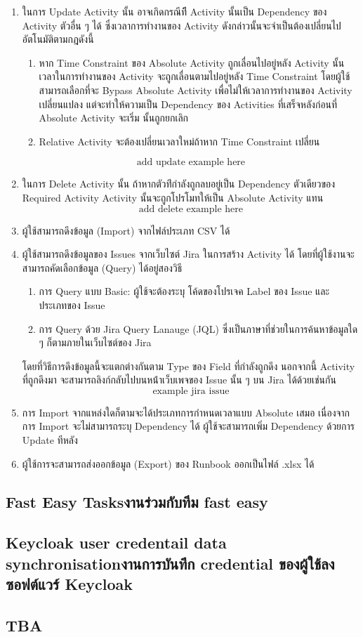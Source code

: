 \begin{enumerate}
\begin{enumerate}
    \end{enumerate}
    \item ในการ Update Activity นั้น อาจเกิดกรณีทีี Activity นั้นเป็น Dependency ของ Activity ตัวอื่น ๆ ได้ ซึ่งเวลาการทำงานของ Activity ดังกล่าวนั้นจะจำเป็นต้องเปลี่ยนไปอัตโนมัติตามกฎดังนี้
    \begin{enumerate}
        \item หาก Time Constraint ของ Absolute Activity ถูกเลื่อนไปอยู่หลัง Activity นั้น เวลาในการทำงานของ Activity จะถูกเลื่อนตามไปอยู่หลัง Time Constraint โดยผู้ใช้สามารถเลือกที่จะ Bypass Absolute Activity เพื่อไม่ให้เวลาการทำงานของ Activity เปลี่ยนแปลง แต่จะทำให้ความเป็น Dependency ของ Activities ที่เสร็จหลังก่อนที่ Absolute Activity จะเริ่ม นั้นถูกยกเลิก 
        \item Relative Activity จะต้องเปลี่ยนเวลาใหม่ถ้าหาก Time Constraint เปลี่ยน
    \end{enumerate}
    \[\text{add update example here}\]
    \item ในการ Delete Activity นั้น ถ้าหากตัวท่ีกำลังถูกลบอยู่เป็น Dependency ตัวเดียวของ Required Activity  Activity นั้นจะถูกโปรโมทให้เป็น Absolute Activity แทน
    \[\text{add delete example here}\]
    \item ผู้ใช้สามารถดึงข้อมูล (Import) จากไฟล์ประเภท CSV ได้ %
    \item ผู้ใช้สามารถดึงข้อมูลของ Issues จากเว็บไซต์ Jira ในการสร้าง​ Activity ได้ โดยที่ผู้ใช้งานจะสามารถคัดเลือกข้อมูล (Query) ได้อยู่สองวิธี
    \begin{enumerate}
        \item การ Query แบบ Basic: ผู้ใช้จะต้องระบุ โค้ดของโปรเจค Label ของ Issue และ ประเภทของ Issue
        \item การ Query ด้วย Jira Query Lanauge (JQL) ซึ่งเป็นภาษาที่ช่วยในการค้นหาข้อมูลใด ๆ ก็ตามภายในเว็บไซต์ของ Jira
    \end{enumerate}
    โดยที่วิธีการดึงข้อมูลนี้จะแตกต่างกันตาม Type ของ Field ที่กำลังถูกดึง นอกจากนี้ Activity ที่ถูกดึงมา จะสามารถลิงก์กลับไปบนหน้่าเว็บเพจของ Issue นั้น ๆ บน Jira ได้ด้วยเช่นกัน
    \[\text{example jira issue}\]
    \item การ Import จากแหล่งใดก็ตามจะได้ประเภทการกำหนดเวลาแบบ Absolute เสมอ เนื่องจากการ Import จะไม่สามารถระบุ Dependency ได้ ผู้ใช้จะสามารถเพิ่ม Dependency ด้วยการ Update ทีหลัง
    \item ผู้ใช้การจะสามารถส่งออกข้อมูล (Export) ของ Runbook ออกเป็นไฟล์ .xlsx ได้

\end{enumerate}

\subsection{\ifenglish Fast Easy Tasks\else งานร่วมกับทีม fast easy\fi}

\subsection{\ifenglish Keycloak user credentail data synchronisation\else งานการบันทึก credential ของผู้ใช้ลงซอฟต์แวร์ Keycloak\fi}

\subsection{TBA}
